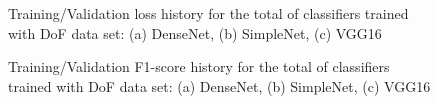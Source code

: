 \begin{figure}[ht!]
    \centering  
    \caption{Training/Validation loss history for the total of classifiers trained with DoF data set: (a) DenseNet, (b) SimpleNet, (c) VGG16}
    \label{c5:dof_training_loss_history}
\end{figure}

\begin{figure}[h!]
    \centering  
    \caption{Training/Validation F1-score history for the total of classifiers trained with DoF data set: (a) DenseNet, (b) SimpleNet, (c) VGG16}
    \label{c5:dof_training_f1_history}
\end{figure}

